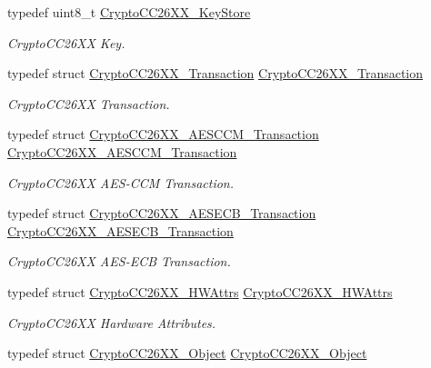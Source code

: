 \begin{DoxyCompactItemize}
typedef uint8\+\_\+t \hyperlink{_crypto_c_c26_x_x_8h_a30e647b6ad6b608b60990929200686e0}{Crypto\+C\+C26\+X\+X\+\_\+\+Key\+Store}
\begin{DoxyCompactList}\small\item\em Crypto\+C\+C26\+X\+X Key. \end{DoxyCompactList}\item 
typedef struct \hyperlink{struct_crypto_c_c26_x_x___transaction}{Crypto\+C\+C26\+X\+X\+\_\+\+Transaction} \hyperlink{_crypto_c_c26_x_x_8h_a7d5a6e41436163786d2e01c0122a3de7}{Crypto\+C\+C26\+X\+X\+\_\+\+Transaction}
\begin{DoxyCompactList}\small\item\em Crypto\+C\+C26\+X\+X Transaction. \end{DoxyCompactList}\item 
typedef struct \hyperlink{struct_crypto_c_c26_x_x___a_e_s_c_c_m___transaction}{Crypto\+C\+C26\+X\+X\+\_\+\+A\+E\+S\+C\+C\+M\+\_\+\+Transaction} \hyperlink{_crypto_c_c26_x_x_8h_a9cf6019bce243720cebc70eb8310682e}{Crypto\+C\+C26\+X\+X\+\_\+\+A\+E\+S\+C\+C\+M\+\_\+\+Transaction}
\begin{DoxyCompactList}\small\item\em Crypto\+C\+C26\+X\+X A\+E\+S-\/\+C\+C\+M Transaction. \end{DoxyCompactList}\item 
typedef struct \hyperlink{struct_crypto_c_c26_x_x___a_e_s_e_c_b___transaction}{Crypto\+C\+C26\+X\+X\+\_\+\+A\+E\+S\+E\+C\+B\+\_\+\+Transaction} \hyperlink{_crypto_c_c26_x_x_8h_a49f5f56e3a3f2f1aa354067e4261533f}{Crypto\+C\+C26\+X\+X\+\_\+\+A\+E\+S\+E\+C\+B\+\_\+\+Transaction}
\begin{DoxyCompactList}\small\item\em Crypto\+C\+C26\+X\+X A\+E\+S-\/\+E\+C\+B Transaction. \end{DoxyCompactList}\item 
typedef struct \hyperlink{struct_crypto_c_c26_x_x___h_w_attrs}{Crypto\+C\+C26\+X\+X\+\_\+\+H\+W\+Attrs} \hyperlink{_crypto_c_c26_x_x_8h_a43b8004f918cfc847b65ebe981970da7}{Crypto\+C\+C26\+X\+X\+\_\+\+H\+W\+Attrs}
\begin{DoxyCompactList}\small\item\em Crypto\+C\+C26\+X\+X Hardware Attributes. \end{DoxyCompactList}\item 
typedef struct \hyperlink{struct_crypto_c_c26_x_x___object}{Crypto\+C\+C26\+X\+X\+\_\+\+Object} \hyperlink{_crypto_c_c26_x_x_8h_a1d3ce506f41ca09dbb4fc02615c54d4e}{Crypto\+C\+C26\+X\+X\+\_\+\+Object}

\end{DoxyCompactItemize}
